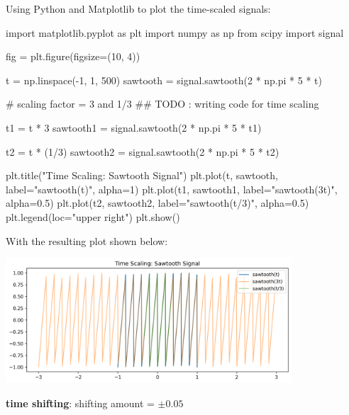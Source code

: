 \documentclass[a4paper, 10pt]{article}
\begin{document}
\begin{solution}
Using Python and Matplotlib to plot the time-scaled signals:
\begin{codingbox}
import matplotlib.pyplot as plt
import numpy as np
from scipy import signal

fig = plt.figure(figsize=(10, 4))

t = np.linspace(-1, 1, 500)
sawtooth = signal.sawtooth(2 * np.pi * 5 * t)

# scaling factor = 3 and 1/3
## TODO : writing code for time scaling

t1 = t * 3
sawtooth1 = signal.sawtooth(2 * np.pi * 5 * t1)

t2 = t * (1/3)
sawtooth2 = signal.sawtooth(2 * np.pi * 5 * t2)

plt.title("Time Scaling: Sawtooth Signal")
plt.plot(t, sawtooth, label="sawtooth(t)", alpha=1)
plt.plot(t1, sawtooth1, label="sawtooth(3t)", alpha=0.5)
plt.plot(t2, sawtooth2, label="sawtooth(t/3)", alpha=0.5)
plt.legend(loc="upper right")
plt.show()
\end{codingbox}

With the resulting plot shown below:
\begin{center}
    \includegraphics[width=0.8\textwidth]{images/problem_6_1.png}
\end{center}
\end{solution}

\newpage

\begin{subproblems}[start=2]
    \item \textbf{time shifting}: shifting amount = \( \pm 0.05 \)
\end{subproblems}
\end{document}
